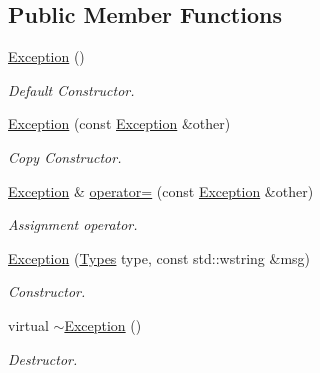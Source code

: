 \subsection*{Public Member Functions}
\begin{DoxyCompactItemize}
\item 
\mbox{\label{classxmlnode_1_1_c_xml_node_1_1_exception_ad3078912e0a640db79884170176cb0a8}} 
\mbox{\hyperlink{classxmlnode_1_1_c_xml_node_1_1_exception_ad3078912e0a640db79884170176cb0a8}{Exception}} ()
\begin{DoxyCompactList}\small\item\em Default Constructor. \end{DoxyCompactList}\item 
\mbox{\hyperlink{classxmlnode_1_1_c_xml_node_1_1_exception_aaefc2a485cf66513101ac27c2389c819}{Exception}} (const \mbox{\hyperlink{classxmlnode_1_1_c_xml_node_1_1_exception}{Exception}} \&other)
\begin{DoxyCompactList}\small\item\em Copy Constructor. \end{DoxyCompactList}\item 
\mbox{\hyperlink{classxmlnode_1_1_c_xml_node_1_1_exception}{Exception}} \& \mbox{\hyperlink{classxmlnode_1_1_c_xml_node_1_1_exception_a40c0f5e49e54cd97c4643c71fbc34014}{operator=}} (const \mbox{\hyperlink{classxmlnode_1_1_c_xml_node_1_1_exception}{Exception}} \&other)
\begin{DoxyCompactList}\small\item\em Assignment operator. \end{DoxyCompactList}\item 
\mbox{\hyperlink{classxmlnode_1_1_c_xml_node_1_1_exception_ad660bb87054a9483c0933efbaddfaa55}{Exception}} (\mbox{\hyperlink{classxmlnode_1_1_c_xml_node_1_1_exception_abdbe07531ef4b19192f1fa2f819ed75f}{Types}} type, const std\+::wstring \&msg)
\begin{DoxyCompactList}\small\item\em Constructor. \end{DoxyCompactList}\item 
\mbox{\label{classxmlnode_1_1_c_xml_node_1_1_exception_ae22ca483e7821c057dec85f06a5e4d32}} 
virtual \mbox{\hyperlink{classxmlnode_1_1_c_xml_node_1_1_exception_ae22ca483e7821c057dec85f06a5e4d32}{$\sim$\+Exception}} ()
\begin{DoxyCompactList}\small\item\em Destructor. \end{DoxyCompactList}\item 

\end{DoxyCompactItemize}
